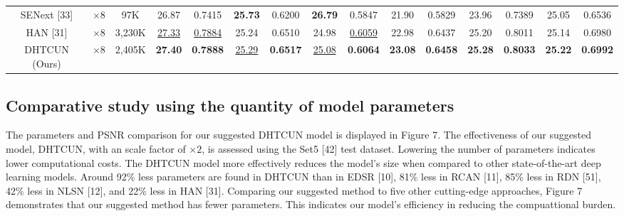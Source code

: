 \documentclass{ieeeaccess}
\begin{document}
\begin{table}
\begin{tabular}{|c|c|c|cc|cc|cc|cc|cc|cc|}
SENext [33] & $\times8$ &97K& \multicolumn{1}{c|}{26.87} &{0.7415} & \multicolumn{1}{c|}{\color{red}\textbf{25.73}} &{0.6200} & \multicolumn{1}{c|}{\color{red}\textbf{26.79}} &{0.5847} & \multicolumn{1}{c|}{21.90} &{0.5829} & \multicolumn{1}{c|}{23.96} &{0.7389} &\multicolumn{1}{c|}{25.05} &{0.6536}  \\


HAN [31] & $\times8$&3,230K& \multicolumn{1}{c|}{\color{blue}\underline{27.33}} &{\color{blue}\underline{0.7884}}   & \multicolumn{1}{c|}{25.24} & 0.6510   &\multicolumn{1}{c|}{24.98} &{\color{blue}\underline{0.6059}}   & \multicolumn{1}{c|}{22.98} &{0.6437} & \multicolumn{1}{c|}{25.20}  &{0.8011} &\multicolumn{1}{c|}{25.14} &{0.6980} \\


DHTCUN (Ours) & $\times8$ &2,405K& \multicolumn{1}{c|}{\color{red}\textbf{27.40}} &{\color{red}\textbf{0.7888}} & \multicolumn{1}{c|}{\color{blue}\underline{25.29}} &{\color{red}\textbf{0.6517}} & \multicolumn{1}{c|}{\color{blue}\underline{25.08}} &{\color{red}\textbf{0.6064}} & \multicolumn{1}{c|}{\color{red}\textbf{23.08}} &{\color{red}\textbf{0.6458}} & \multicolumn{1}{c|}{\color{red}\textbf{25.28}} &{\color{red}\textbf{0.8033}} &\multicolumn{1}{c|}{\color{red}\textbf{25.22}} &{\color{red}\textbf{0.6992}}  \\

\hline


\end{tabular}
\end{table}



\subsection{Comparative study using the quantity of model parameters}
The parameters and PSNR comparison for our suggested DHTCUN model is displayed in Figure 7. The effectiveness of our suggested model, DHTCUN, with an scale factor of $\times 2$, is assessed using the Set5 [42] test dataset. Lowering the number of parameters indicates lower computational costs. The DHTCUN model more effectively reduces the model's size when compared to other state-of-the-art deep learning models. Around 92\% less parameters are found in DHTCUN than in EDSR [10], 81\% less in RCAN [11], 85\% less in RDN [51], 42\% less in NLSN [12], and 22\% less in HAN [31]. Comparing our suggested method to five other cutting-edge approaches, Figure 7 demonstrates that our suggested method has fewer parameters. This indicates our model's efficiency in reducing the compuattional burden.
\end{document}
